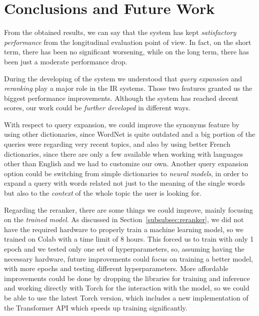 \section{Conclusions and Future Work}
\label{sec:conclusion}

From the obtained results, we can say that the system has kept \emph{satisfactory performance} from the longitudinal evaluation point of view. In fact, on the short term, there has been no significant worsening, while on the long term, there has been just a moderate performance drop.

During the developing of the system we understood that \emph{query expansion} and \emph{reranking} play a major role in the \ac{IR} systems. Those two features granted us the biggest performance improvements. Although the system has reached decent scores, our work could be  \emph{further developed} in different ways.

With respect to query expansion, we could improve the synonyms feature by using other dictionaries, since WordNet is quite outdated and a big portion of the queries were regarding very recent topics, and also by using better French dictionaries, since there are only a few available when working with languages other than English and we had to customize our own.
Another query expansion option could be switching from simple dictionaries to \emph{neural models}, in order to expand a query with words related not just to the meaning of the single words but also to the \emph{context} of the whole topic the user is looking for.

Regarding the reranker, there are some things we could improve, mainly focusing on the  \emph{trained model}. As discussed in Section~\ref{subsubsec:reranker}, we did not have the required hardware to properly train a machine learning model, so we trained on Colab with a time limit of 8 hours. This forced us to train with only 1 epoch and we tested only one set of hyperparameters, so, assuming having the necessary hardware, future improvements could focus on training a better model, with more epochs and testing different hyperparameters.
More affordable improvements could be done by dropping the libraries for training and inference and working directly with Torch for the interaction with the model, so we could be able to use the latest Torch version, which includes a new implementation of the Transformer API which speeds up training significantly.